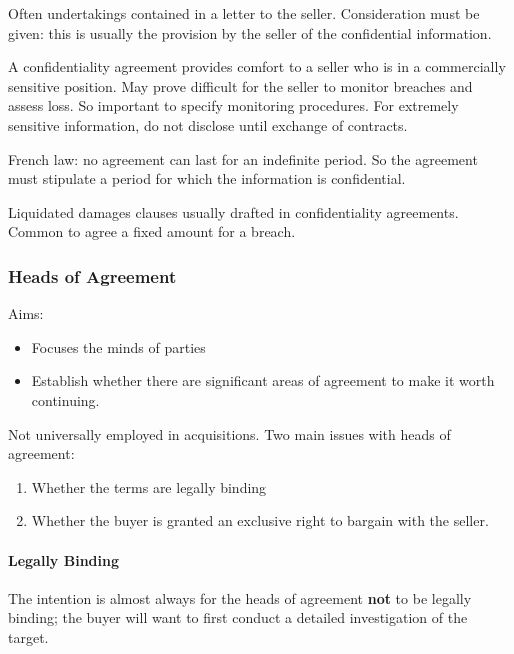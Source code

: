 \documentclass[
]{article}
\providecommand{\tightlist}{%
  \setlength{\itemsep}{0pt}\setlength{\parskip}{0pt}}
\begin{document}
Often undertakings contained in a letter to the seller. Consideration
must be given: this is usually the provision by the seller of the
confidential information.

A confidentiality agreement provides comfort to a seller who is in a
commercially sensitive position. May prove difficult for the seller to
monitor breaches and assess loss. So important to specify monitoring
procedures. For extremely sensitive information, do not disclose until
exchange of contracts.

French law: no agreement can last for an indefinite period. So the
agreement must stipulate a period for which the information is
confidential.

Liquidated damages clauses usually drafted in confidentiality
agreements. Common to agree a fixed amount for a breach.

\hypertarget{heads-of-agreement-1}{%
\subsubsection{Heads of Agreement}\label{heads-of-agreement-1}}

Aims:

\begin{itemize}
\tightlist
\item
  Focuses the minds of parties
\item
  Establish whether there are significant areas of agreement to make it
  worth continuing.
\end{itemize}

Not universally employed in acquisitions. Two main issues with heads of
agreement:

\begin{enumerate}
\tightlist
\item
  Whether the terms are legally binding
\item
  Whether the buyer is granted an exclusive right to bargain with the
  seller.
\end{enumerate}

\hypertarget{legally-binding}{%
\paragraph{Legally Binding}\label{legally-binding}}

The intention is almost always for the heads of agreement \textbf{not}
to be legally binding; the buyer will want to first conduct a detailed
investigation of the target.
\end{document}
